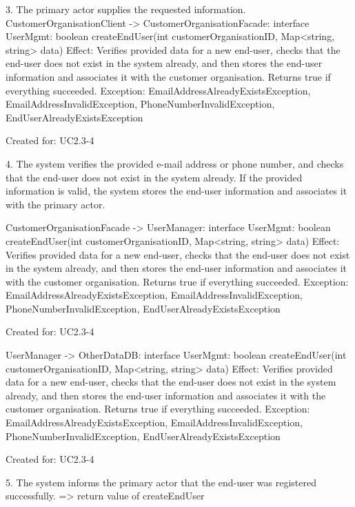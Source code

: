         3. The primary actor supplies the requested information.
            CustomerOrganisationClient -> CustomerOrganisationFacade: interface UserMgmt: boolean createEndUser(int customerOrganisationID, Map<string, string> data)
                Effect: Verifies provided data for a new end-user, checks that the end-user does not exist in the system already, and then stores the end-user information
                        and associates it with the customer organisation. Returns true if everything succeeded.
                Exception: EmailAddressAlreadyExistsException, EmailAddressInvalidException, PhoneNumberInvalidException, EndUserAlreadyExistsException
                \item Created for: UC2.3-4

        4. The system verifies the provided e-mail address or phone number, and checks that the end-user
            does not exist in the system already. If the provided information is valid, the system stores
            the end-user information and associates it with the primary actor.

            CustomerOrganisationFacade -> UserManager: interface UserMgmt: boolean createEndUser(int customerOrganisationID, Map<string, string> data)
                Effect: Verifies provided data for a new end-user, checks that the end-user does not exist in the system already, and then stores the end-user information
                        and associates it with the customer organisation. Returns true if everything succeeded.
                Exception: EmailAddressAlreadyExistsException, EmailAddressInvalidException, PhoneNumberInvalidException, EndUserAlreadyExistsException
                \item Created for: UC2.3-4

            UserManager -> OtherDataDB: interface UserMgmt: boolean createEndUser(int customerOrganisationID, Map<string, string> data)
                Effect: Verifies provided data for a new end-user, checks that the end-user does not exist in the system already, and then stores the end-user information
                        and associates it with the customer organisation. Returns true if everything succeeded.
                Exception: EmailAddressAlreadyExistsException, EmailAddressInvalidException, PhoneNumberInvalidException, EndUserAlreadyExistsException
                \item Created for: UC2.3-4

        5. The system informs the primary actor that the end-user was registered successfully.
            => return value of createEndUser

